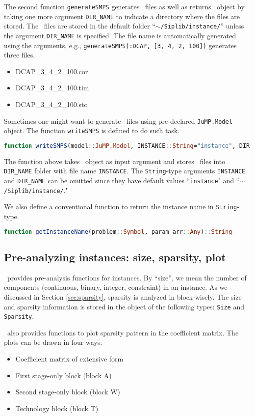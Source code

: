 The second function \texttt{generateSMPS} generates \smps\ files as well as returns \jumpmodel\ object by taking one more argument \texttt{DIR\_NAME} to indicate a directory where the files are stored. The \smps\ files are stored in the default folder ``\texttt{$\sim$/Siplib/instance/}'' unless the argument \texttt{DIR\_NAME} is specified. The file name is automatically generated using the arguments, e.g., \texttt{generateSMPS(:DCAP, [3, 4, 2, 100])} generates three files.
\begin{itemize}
	\item DCAP\_3\_4\_2\_100.cor
	\item DCAP\_3\_4\_2\_100.tim
	\item DCAP\_3\_4\_2\_100.sto
\end{itemize}
Sometimes one might want to generate \smps\ files using pre-declared \texttt{JuMP.Model} object. The function \texttt{writeSMPS} is defined to do such task.
\begin{lstlisting}[frame=single,language=julia]
function writeSMPS(model::JuMP.Model, INSTANCE::String="instance", DIR_NAME::String="$(dirname(@__FILE__))/../instance")
\end{lstlisting}
The function above takes \jumpmodel\ object as input argument and stores \smps\ files into \texttt{DIR\_NAME} folder with file name \texttt{INSTANCE}. The \texttt{String}-type arguments \texttt{INSTANCE} and \texttt{DIR\_NAME} can be omitted since they have default values ``\texttt{instance}" and ``\texttt{$\sim$/Siplib/instance/}."

We also define a conventional function to return the instance name in \texttt{String}-type.
\begin{lstlisting}[frame=single,language=julia]
function getInstanceName(problem::Symbol, param_arr::Any)::String
\end{lstlisting}

\subsection{Pre-analyzing instances: size, sparsity, plot}
\siplibjl\ provides pre-analysis functions for instances. By ``size'', we mean the number of components (continuous, binary, integer, constraint) in an instance. As we discussed in Section \ref{sec:sparsity}, sparsity is analyzed in block-wisely. The size and sparsity information is stored in the object of the following types: \texttt{Size} and \texttt{Sparsity}.

\siplibjl\ also provides functions to plot sparsity pattern in the coefficient matrix. The plots can be drawn in four ways. 
\begin{itemize}
	\item Coefficient matrix of extensive form
	\item First stage-only block (block A)
	\item Second stage-only block (block W)
	\item Technology block (block T)
\end{itemize}

